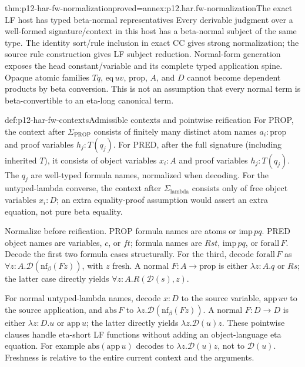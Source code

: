 \begin{hblemma}{thm:p12-har-fw-normalization}{proved=annex:p12.har.fw-normalization}{The exact LF host has typed beta-normal representatives}
Every derivable judgment over a well-formed signature/context in this
host has a beta-normal subject of the same type. The identity sort/rule
inclusion in exact CC gives strong normalization; the source rule
construction gives LF subject reduction. Normal-form generation exposes
the head constant/variable and its complete typed application spine.
Opaque atomic families \(Tq\), \(\mathrm{eq}\,uv\),
\(\mathrm{prop}\), \(A\), and \(D\) cannot become dependent
products by beta conversion. This is not an assumption that every
normal term is beta-convertible to an eta-long canonical term.
\end{hblemma}

\begin{hbdefinition}{def:p12-har-fw-contexts}{Admissible contexts and pointwise reification}
For PROP, the context after \(\Sigma_{\mathrm{PROP}}\) consists
of finitely many distinct atom names \(a_i:\mathrm{prop}\) and
proof variables \(h_j:T(q_j)\). For PRED, after the full signature
(including inherited \(T\)), it consists of object variables
\(x_i:A\) and proof variables \(h_j:T(q_j)\).
The \(q_j\) are well-typed formula names, normalized when decoding.
For the untyped-lambda converse, the context after
\(\Sigma_{\mathrm{lambda}}\) consists only of free object
variables \(x_i:D\); an extra equality-proof assumption would assert
an extra equation, not pure beta equality.

Normalize before reification. PROP formula names are atoms or
\(\mathrm{imp}\,p q\). PRED object names are variables, \(c\),
or \(ft\); formula names are \(Rst\), \(\mathrm{imp}\,p q\),
or \(\mathrm{forall}\,F\). Decode the first two formula cases
structurally. For the third, decode
\(\mathrm{forall}\,F\) as
\(\forall z:A.\mathcal D(\mathrm{nf}_\beta(Fz))\), with \(z\)
fresh. A normal \(F:A\to\mathrm{prop}\) is either
\(\lambda z:A.q\) or \(Rs\); the latter case directly yields
\(\forall z:A.R(\mathcal D(s),z)\).

For normal untyped-lambda names, decode \(x:D\) to the source
variable, \(\mathrm{app}\,uv\) to the source application, and
\(\mathrm{abs}\,F\) to
\(\lambda z.\mathcal D(\mathrm{nf}_\beta(Fz))\).
A normal \(F:D\to D\) is either \(\lambda z:D.u\) or
\(\mathrm{app}\,u\); the latter directly yields
\(\lambda z.\mathcal D(u)z\). These pointwise clauses handle
eta-short LF functions without adding an object-language eta equation.
For example \(\mathrm{abs}(\mathrm{app}\,u)\) decodes to
\(\lambda z.\mathcal D(u)z\), not to \(\mathcal D(u)\).
Freshness is relative to the entire current context and the arguments.
\end{hbdefinition}

